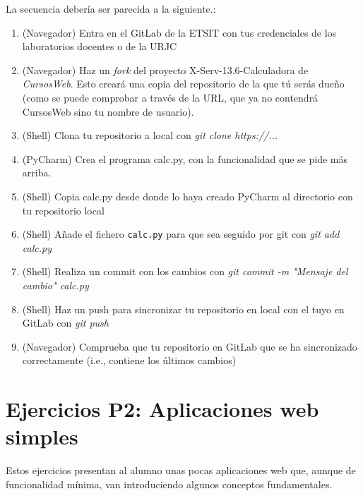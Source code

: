 La secuencia debería ser parecida a la siguiente.:

\begin{enumerate}
  \item (Navegador) Entra en el GitLab de la ETSIT con tus credenciales de los laboratorios docentes o de la URJC
  \item (Navegador) Haz un \emph{fork} del proyecto X-Serv-13.6-Calculadora de \emph{CursosWeb}. Esto creará una copia del repositorio de la que tú serás dueño (como se puede comprobar a través de la URL, que ya no contendrá CursosWeb sino tu nombre de usuario).
  \item (Shell) Clona tu repositorio a local con \emph{git clone https://...}
  \item (PyCharm) Crea el programa calc.py, con la funcionalidad que se pide más arriba.
  \item (Shell) Copia calc.py desde donde lo haya creado PyCharm al directorio con tu repositorio local
  \item (Shell) Añade el fichero \texttt{calc.py} para que sea seguido por git con \emph{git add calc.py} 
  \item (Shell) Realiza un commit con los cambios con \emph{git commit -m "Mensaje del cambio" calc.py}
  \item (Shell) Haz un push para sincronizar tu repositorio en local con el tuyo en GitLab con \emph{git push}
  \item (Navegador) Comprueba que tu repositorio en GitLab que se ha sincronizado correctamente (i.e., contiene los últimos cambios)
\end{enumerate}


\newpage

\section{Ejercicios P2: Aplicaciones web simples}

Estos ejercicios presentan al alumno unas pocas aplicaciones web que, aunque de funcionalidad mínima, van introduciendo algunos conceptos fundamentales.

